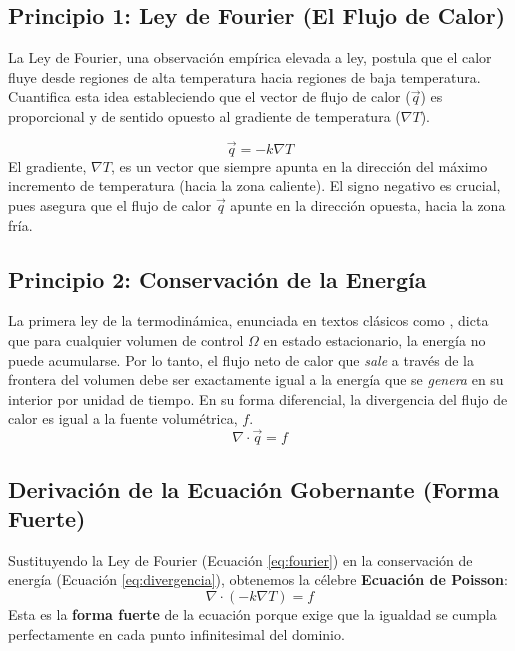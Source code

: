 \subsection{Principio 1: Ley de Fourier (El Flujo de Calor)}
La Ley de Fourier, una observación empírica elevada a ley, postula que el calor fluye desde regiones de alta temperatura hacia regiones de baja temperatura. Cuantifica esta idea estableciendo que el vector de flujo de calor ($\vec{q}$) es proporcional y de sentido opuesto al gradiente de temperatura ($\nabla T$).

\begin{equation}
    \vec{q} = -k \nabla T
    \label{eq:fourier}
\end{equation}
El gradiente, $\nabla T$, es un vector que siempre apunta en la dirección del máximo incremento de temperatura (hacia la zona caliente). El signo negativo es crucial, pues asegura que el flujo de calor $\vec{q}$ apunte en la dirección opuesta, hacia la zona fría.

\subsection{Principio 2: Conservación de la Energía}
La primera ley de la termodinámica, enunciada en textos clásicos como \cite{incropera2007}, dicta que para cualquier volumen de control $\Omega$ en estado estacionario, la energía no puede acumularse. Por lo tanto, el flujo neto de calor que \textit{sale} a través de la frontera del volumen debe ser exactamente igual a la energía que se \textit{genera} en su interior por unidad de tiempo. En su forma diferencial, la divergencia del flujo de calor es igual a la fuente volumétrica, $f$.
\begin{equation}
    \nabla \cdot \vec{q} = f
    \label{eq:divergencia}
\end{equation}

\subsection{Derivación de la Ecuación Gobernante (Forma Fuerte)}
Sustituyendo la Ley de Fourier (Ecuación \ref{eq:fourier}) en la conservación de energía (Ecuación \ref{eq:divergencia}), obtenemos la célebre \textbf{Ecuación de Poisson}:
\begin{equation}
    \nabla \cdot (-k \nabla T) = f
    \label{eq:poisson}
\end{equation}
Esta es la \textbf{forma fuerte} de la ecuación porque exige que la igualdad se cumpla perfectamente en cada punto infinitesimal del dominio.

